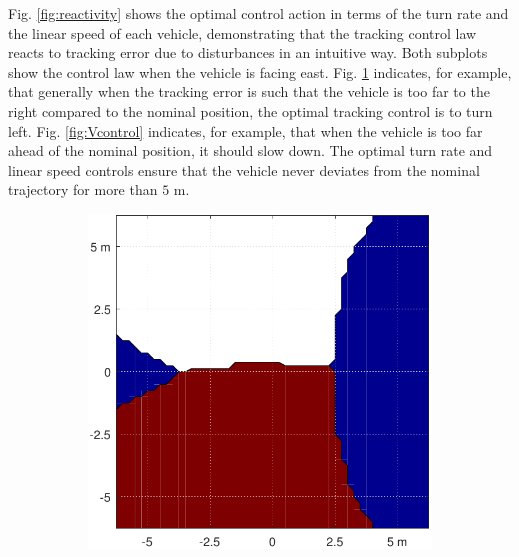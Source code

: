 Fig. \ref{fig:reactivity} shows the optimal control action in terms of the turn rate and the linear speed of each vehicle, demonstrating that the tracking control law reacts to tracking error due to disturbances in an intuitive way. Both subplots show the control law when the vehicle is facing east. Fig. \ref{fig:Wcontrol} indicates, for example, that generally when the tracking error is such that the vehicle is too far to the right compared to the nominal position, the optimal tracking control is to turn left. Fig. \ref{fig:Vcontrol} indicates, for example, that when the vehicle is too far ahead of the nominal position, it should slow down. The optimal turn rate and linear speed controls ensure that the vehicle never deviates from the nominal trajectory for more than $5$ m.

\begin{figure}[!htb]
  \centering
  \begin{subfigure}{0.5\textwidth}
    \includegraphics[width=\columnwidth]{figs/Wcontrol}
    \label{fig:Wcontrol}
  \end{subfigure}%
  \begin{subfigure}{0.5\textwidth}

\end{subfigure}
\end{figure}
